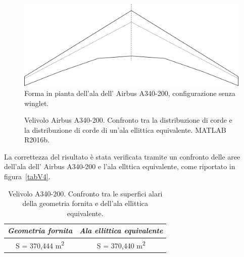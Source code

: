 \begin {figure} [H]
\centering
\includegraphics[width= \textwidth ]{images/fileImg/Parte_3-Aerodinamica_Velivolo_A340-200/AlaA340_200_nowl.png}
\caption{\footnotesize Forma in pianta dell'ala dell' Airbus A340-200, configurazione senza winglet.}
\label {fig:V3}
\end {figure}
\begin{figure}[h!]
	\centering
	\caption{\footnotesize Velivolo Airbus A340-200. Confronto tra la distribuzione di corde e la distribuzione di corde di un'ala ellittica equivalente. MATLAB R2016b. }
	\label{fig:V4}
\end{figure}

La correttezza del risultato è stata verificata tramite un confronto delle aree dell'ala dell' Airbus A340-200 e l'ala ellttica equivalente, come riportato in figura~\vref{tabV4}.

\begin{table} [!h]\centering {}
	\begin{tabular}{c c }
		\toprule
		\emph{Geometria fornita }& \emph{Ala ellittica equivalente}\\ 
		\midrule
		S = 370,444 \si{m^2} &	S = 370,440 \si{m^2}\\
		\bottomrule
	\end{tabular}
	\caption {\footnotesize Velivolo A340-200. Confronto tra le superfici alari della geometria fornita e dell'ala ellittica equivalente.}
	\label{tabV4}
\end{table}

